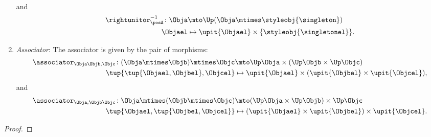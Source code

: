 \begin{lemma}
\begin{enumerate}
\begin{equation}
\begin{aligned}
        \end{aligned}
    \end{equation}
    and
    \begin{equation}
        \begin{aligned}
            \rightunitor_\posA^{-1}\colon \Obja &\mto \Up( \Obja \mtimes \styleobj{\singleton}) \\
            \Objael&\mapsto \upit \{\Objael\} \times \{\styleobj{\singletonel}\}.
        \end{aligned}
    \end{equation}
    \item \emph{Associator}: The associator is given by the pair of morphisms:
    \begin{equation}
        \begin{aligned}
            \associator_{\Obja\Objb,\Objc}\colon (\Obja\mtimes \Objb)\mtimes \Objc &\mto \Up \Obja\times (\Up \Objb \times \Up \Objc)\\
            \tup{\tup{\Objael,\Objbel},\Objcel}&\mapsto \upit\{\Objael\}\times (\upit\{\Objbel\}\times \upit\{\Objcel\}),
        \end{aligned}
    \end{equation}
    and
    \begin{equation}
        \begin{aligned}
            \associator_{\Obja,\Objb\Objc}\colon \Obja\mtimes (\Objb\mtimes \Objc) &\mto (\Up \Obja\times \Up \Objb) \times \Up \Objc\\
            \tup{\Objael,\tup{\Objbel,\Objcel}}&\mapsto (\upit\{\Objael\}\times \upit\{\Objbel\})\times \upit\{\Objcel\}.
        \end{aligned}
    \end{equation}
\end{enumerate}
\end{lemma}
\begin{proof}
\end{proof}

